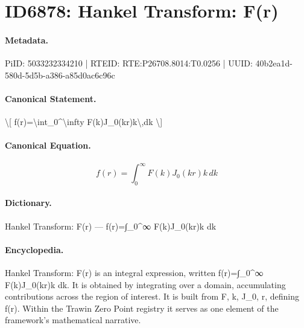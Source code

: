 \section*{ID6878: Hankel Transform: F(r)}
\paragraph{Metadata.}
PiID: 5033232334210 | RTEID: RTE:P26708.8014:T0.0256 | UUID: 40b2ea1d-580d-5d5b-a386-a85d0ac6c96c

\paragraph{Canonical Statement.}
\textbackslash{}[ f(r)=\textbackslash{}int\_0\textasciicircum{}\textbackslash{}infty F(k)J\_0(kr)k\textbackslash{},dk \textbackslash{}]

\paragraph{Canonical Equation.}
\[
f(r)=\int_0^\infty F(k)J_0(kr)k\,dk
\]

\paragraph{Dictionary.}
Hankel Transform: F(r) — f(r)=∫\_0\textasciicircum{}∞ F(k)J\_0(kr)k dk

\paragraph{Encyclopedia.}
Hankel Transform: F(r) is an integral expression, written f(r)=∫\_0\textasciicircum{}∞ F(k)J\_0(kr)k dk. It is obtained by integrating over a domain, accumulating contributions across the region of interest. It is built from F, k, J\_0, r, defining f(r). Within the Trawin Zero Point registry it serves as one element of the framework's mathematical narrative.
